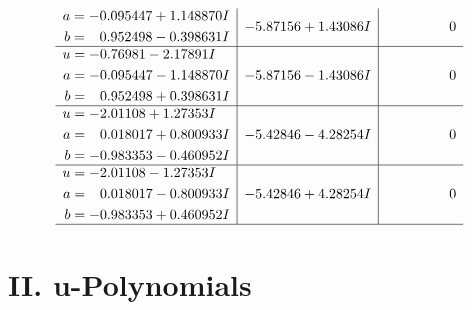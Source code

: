 \documentclass[1p]{elsarticle_modified}
\theoremstyle{definition}
\begin{document}
$$\begin{array}{c|c|c}
\begin{aligned}
a &= -0.095447 + 1.148870 I \\
b &= \phantom{-}0.952498 - 0.398631 I\end{aligned}
 & -5.87156 + 1.43086 I & \phantom{-0.000000 } 0 \\ \hline\begin{aligned}
u &= -0.76981 - 2.17891 I \\
a &= -0.095447 - 1.148870 I \\
b &= \phantom{-}0.952498 + 0.398631 I\end{aligned}
 & -5.87156 - 1.43086 I & \phantom{-0.000000 } 0 \\ \hline\begin{aligned}
u &= -2.01108 + 1.27353 I \\
a &= \phantom{-}0.018017 + 0.800933 I \\
b &= -0.983353 - 0.460952 I\end{aligned}
 & -5.42846 - 4.28254 I & \phantom{-0.000000 } 0 \\ \hline\begin{aligned}
u &= -2.01108 - 1.27353 I \\
a &= \phantom{-}0.018017 - 0.800933 I \\
b &= -0.983353 + 0.460952 I\end{aligned}
 & -5.42846 + 4.28254 I & \phantom{-0.000000 } 0\\
 \hline 
 \end{array}$$\newpage
\newpage\renewcommand{\arraystretch}{1}
\centering \section*{ II. u-Polynomials}
\end{document}
